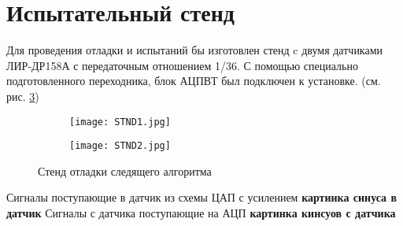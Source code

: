\newpage
\section{Испытательный стенд}

Для проведения отладки и испытаний бы изготовлен стенд c двумя датчиками ЛИР-ДР158А с передаточным отношением 1/36. 
С помощью специально подготовленного переходника, блок АЦПВТ был подключен к установке. (см. рис. \ref{STND}) 

\begin{figure}[!h]
  \centering
  \begin{subfigure}[b]{0.6\textwidth}
    \centering
    \texttt{[image: STND1.jpg]} 
    \label{STND1}
  \end{subfigure}
  \hfill
  \begin{subfigure}[b]{0.35\textwidth}
    \centering
    \texttt{[image: STND2.jpg]} 
    \label{STND2}
  \end{subfigure}

  \caption{Стенд отладки следящего алгоритма}
  \label{STND} 
\end{figure}

Сигналы поступающие в датчик из схемы ЦАП с усилением \textbf{картинка синуса в датчик}
Сигналы с датчика поступающие на АЦП \textbf{картинка кинсуов с датчика}